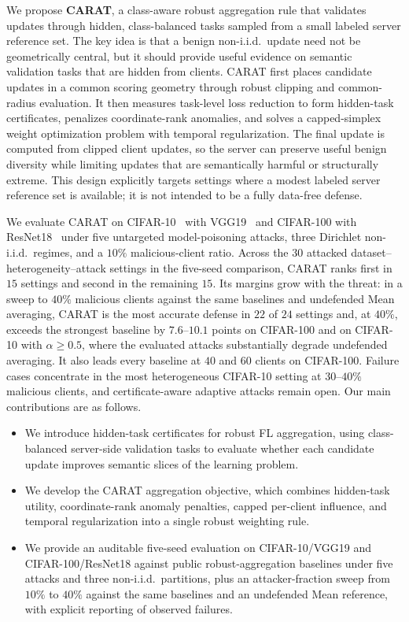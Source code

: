 We propose \textbf{CARAT}, a class-aware robust aggregation rule that validates updates through hidden, class-balanced tasks sampled from a small labeled server reference set. The key idea is that a benign non-i.i.d.\ update need not be geometrically central, but it should provide useful evidence on semantic validation tasks that are hidden from clients. CARAT first places candidate updates in a common scoring geometry through robust clipping and common-radius evaluation. It then measures task-level loss reduction to form hidden-task certificates, penalizes coordinate-rank anomalies, and solves a capped-simplex weight optimization problem with temporal regularization. The final update is computed from clipped client updates, so the server can preserve useful benign diversity while limiting updates that are semantically harmful or structurally extreme. This design explicitly targets settings where a modest labeled server reference set is available; it is not intended to be a fully data-free defense.

We evaluate CARAT on CIFAR-10~\citep{krizhevsky2009learning} with VGG19~\citep{simonyan2015verydeep} and CIFAR-100 with ResNet18~\citep{he2016deep} under five untargeted model-poisoning attacks, three Dirichlet non-i.i.d.\ regimes, and a $10\%$ malicious-client ratio. Across the $30$ attacked dataset--heterogeneity--attack settings in the five-seed comparison, CARAT ranks first in $15$ settings and second in the remaining $15$. Its margins grow with the threat: in a sweep to $40\%$ malicious clients against the same baselines and undefended Mean averaging, CARAT is the most accurate defense in $22$ of $24$ settings and, at $40\%$, exceeds the strongest baseline by $7.6$--$10.1$ points on CIFAR-100 and on CIFAR-10 with $\alpha\ge0.5$, where the evaluated attacks substantially degrade undefended averaging. It also leads every baseline at $40$ and $60$ clients on CIFAR-100. Failure cases concentrate in the most heterogeneous CIFAR-10 setting at $30$--$40\%$ malicious clients, and certificate-aware adaptive attacks remain open. Our main contributions are as follows.

\begin{itemize}
\item We introduce hidden-task certificates for robust FL aggregation, using class-balanced server-side validation tasks to evaluate whether each candidate update improves semantic slices of the learning problem.
\item We develop the CARAT aggregation objective, which combines hidden-task utility, coordinate-rank anomaly penalties, capped per-client influence, and temporal regularization into a single robust weighting rule.
\item We provide an auditable five-seed evaluation on CIFAR-10/VGG19 and CIFAR-100/ResNet18 against public robust-aggregation baselines under five attacks and three non-i.i.d.\ partitions, plus an attacker-fraction sweep from $10\%$ to $40\%$ against the same baselines and an undefended Mean reference, with explicit reporting of observed failures.
\end{itemize}
